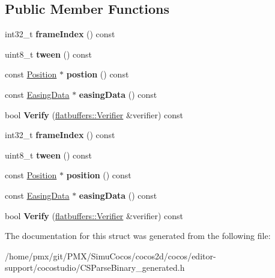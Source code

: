 \subsection*{Public Member Functions}
\begin{DoxyCompactItemize}
\item 
\mbox{\label{structflatbuffers_1_1PointFrame_aeb4a402c213115972da0f7a4e75ec78b}} 
int32\+\_\+t {\bfseries frame\+Index} () const
\item 
\mbox{\label{structflatbuffers_1_1PointFrame_ac4bb4f2a6b90cfa8aaf9c9e43847eb5d}} 
uint8\+\_\+t {\bfseries tween} () const
\item 
\mbox{\label{structflatbuffers_1_1PointFrame_a4b22c709024531c16b2441580a0f78b6}} 
const \hyperlink{structPosition}{Position} $\ast$ {\bfseries postion} () const
\item 
\mbox{\label{structflatbuffers_1_1PointFrame_af4567c472fd80044a919cba6f914ddab}} 
const \hyperlink{structflatbuffers_1_1EasingData}{Easing\+Data} $\ast$ {\bfseries easing\+Data} () const
\item 
\mbox{\label{structflatbuffers_1_1PointFrame_a3b4d6792d701f725c941e581ba58ae7d}} 
bool {\bfseries Verify} (\hyperlink{classflatbuffers_1_1Verifier}{flatbuffers\+::\+Verifier} \&verifier) const
\item 
\mbox{\label{structflatbuffers_1_1PointFrame_aeb4a402c213115972da0f7a4e75ec78b}} 
int32\+\_\+t {\bfseries frame\+Index} () const
\item 
\mbox{\label{structflatbuffers_1_1PointFrame_ac4bb4f2a6b90cfa8aaf9c9e43847eb5d}} 
uint8\+\_\+t {\bfseries tween} () const
\item 
\mbox{\label{structflatbuffers_1_1PointFrame_ad1f4ae73922a5e2a3327a90627b1ffd3}} 
const \hyperlink{structPosition}{Position} $\ast$ {\bfseries position} () const
\item 
\mbox{\label{structflatbuffers_1_1PointFrame_af4567c472fd80044a919cba6f914ddab}} 
const \hyperlink{structflatbuffers_1_1EasingData}{Easing\+Data} $\ast$ {\bfseries easing\+Data} () const
\item 
\mbox{\label{structflatbuffers_1_1PointFrame_a3b4d6792d701f725c941e581ba58ae7d}} 
bool {\bfseries Verify} (\hyperlink{classflatbuffers_1_1Verifier}{flatbuffers\+::\+Verifier} \&verifier) const
\end{DoxyCompactItemize}


The documentation for this struct was generated from the following file\+:\begin{DoxyCompactItemize}
\item 
/home/pmx/git/\+P\+M\+X/\+Simu\+Cocos/cocos2d/cocos/editor-\/support/cocostudio/C\+S\+Parse\+Binary\+\_\+generated.\+h\end{DoxyCompactItemize}
